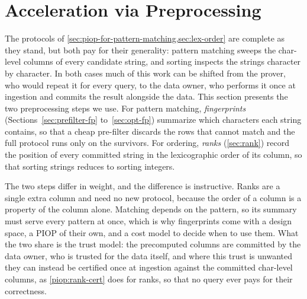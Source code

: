 \doclearpage
\section{Acceleration via Preprocessing}
\label{sec:preprocessing}

The protocols of \cref{sec:piop-for-pattern-matching,sec:lex-order} are complete as they stand, but both pay for their generality: pattern matching sweeps the char-level columns of every candidate string, and sorting inspects the strings character by character. In both cases much of this work can be shifted from the prover, who would repeat it for every query, to the data owner, who performs it once at ingestion and commits the result alongside the data. This section presents the two preprocessing steps we use. For pattern matching, \emph{fingerprints} (Sections~\ref{sec:prefilter-fp} to~\ref{sec:opt-fp}) summarize which characters each string contains, so that a cheap pre-filter discards the rows that cannot match and the full protocol runs only on the survivors. For ordering, \emph{ranks} (\cref{sec:rank}) record the position of every committed string in the lexicographic order of its column, so that sorting strings reduces to sorting integers.

The two steps differ in weight, and the difference is instructive. Ranks are a single extra column and need no new protocol, because the order of a column is a property of the column alone. Matching depends on the pattern, so its summary must serve every pattern at once, which is why fingerprints come with a design space, a PIOP of their own, and a cost model to decide when to use them. What the two share is the trust model: the precomputed columns are committed by the data owner, who is trusted for the data itself, and where this trust is unwanted they can instead be certified once at ingestion against the committed char-level columns, as \cref{piop:rank-cert} does for ranks, so that no query ever pays for their correctness.




